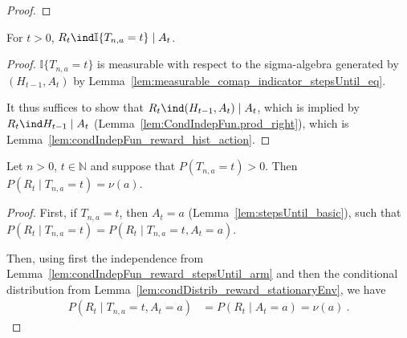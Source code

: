 \begin{proof}\leanok

\end{proof}


\begin{lemma}\label{lem:condIndepFun_reward_stepsUntil_arm}
  \leanok
For $t > 0$, $R_t \ind \mathbb{I}\{T_{n, a} = t\} \mid A_t$.
\end{lemma}

\begin{proof}\leanok
$\mathbb{I}\{T_{n, a} = t\}$ is measurable with respect to the sigma-algebra generated by $(H_{t-1}, A_t)$ by Lemma~\ref{lem:measurable_comap_indicator_stepsUntil_eq}.

It thus suffices to show that $R_t \ind (H_{t-1}, A_t) \mid A_t$, which is implied by $R_t \ind H_{t-1} \mid A_t$ (Lemma~\ref{lem:CondIndepFun.prod_right}), which is Lemma~\ref{lem:condIndepFun_reward_hist_action}.
\end{proof}


\begin{lemma}\label{lem:reward_cond_stepsUntil}
  \leanok
Let $n > 0$, $t \in \mathbb{N}$ and suppose that $P(T_{n, a} = t) > 0$.
Then $P(R_t \mid T_{n, a} = t) = \nu(a)$.
\end{lemma}

\begin{proof}\leanok
First, if $T_{n, a} = t$, then $A_t = a$ (Lemma~\ref{lem:stepsUntil_basic}), such that $P(R_t \mid T_{n, a} = t) = P(R_t \mid T_{n, a} = t, A_t = a)$.

Then, using first the independence from Lemma~\ref{lem:condIndepFun_reward_stepsUntil_arm} and then the conditional distribution from Lemma~\ref{lem:condDistrib_reward_stationaryEnv}, we have
\begin{align*}
  P(R_t \mid T_{n, a} = t, A_t = a)
  &= P(R_t \mid A_t = a)
  = \nu(a)
  \: .
\end{align*}
\end{proof}


